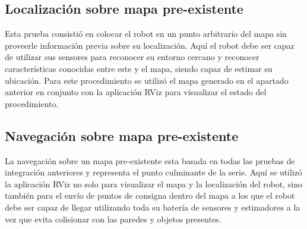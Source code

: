 \subsection{Localización sobre mapa pre-existente}

Esta prueba consistió en colocar el robot en un punto arbitrario del mapa sin proveerle información previa sobre su localización. Aquí el robot debe ser capaz de utilizar sus sensores para reconocer su entorno cercano y reconocer características conocidas entre este y el mapa, siendo capaz de estimar su ubicación. Para este procedimiento se utilizó el mapa generado en el apartado anterior en conjunto con la aplicación RViz para visualizar el estado del procedimiento.

\subsection{Navegación sobre mapa pre-existente}

La navegación sobre un mapa pre-existente esta basada en todas las pruebas de integración anteriores y representa el punto culminante de la serie. Aquí se utilizó la aplicación RViz no solo para visualizar el mapa y la localización del robot, sino también para el envío de puntos de consigna dentro del mapa a los que el robot debe ser capaz de llegar utilizando toda su batería de sensores y estimadores a la vez que evita colisionar con las paredes y objetos presentes.

\label{sec:pruebasIN}